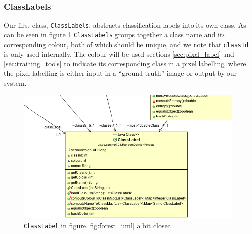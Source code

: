 \documentclass[12pt,twoside,notitlepage]{report}
\begin{document}
            \subsubsection{ClassLabels}
                Our first class, \texttt{ClassLabels}, abstracts classification labels into its own class. As can be 
                seen in figure \ref{fig:class_label_uml} \texttt{ClassLabels} groups together a class name and its 
                corresponding colour, both of which should be unique, and we note that \texttt{classId} is only used 
                internally. The colour will be used sections 
                \ref{sec:pixel_label} and \ref{sec:training_tools} to indicate its corresponding class in a pixel 
                labelling, where the pixel labelling is either input in a ``ground truth'' image or output by our system.                

                \begin{figure}[H]
                    \centering
                    \includegraphics[scale=0.5]{ClassLabel_Forest_UML}
                    \caption{\texttt{ClassLabel} in figure \ref{fig:forest_uml} a bit closer.}
                    \label{fig:class_label_uml}
                \end{figure}
\end{document}
